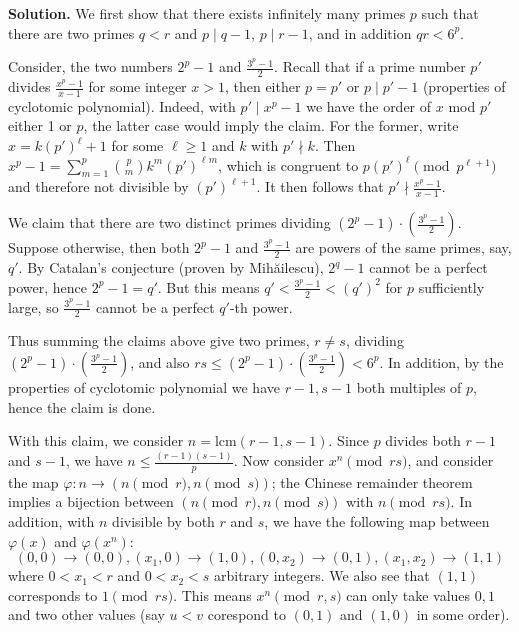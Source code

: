 \documentclass[11pt,a4paper]{article}
\begin{document}
\begin{enumerate}
	\textbf{Solution.} 
	We first show that there exists infinitely many primes $p$ such that there are two primes $q< r$ and $p\mid q-1$, $p\mid r - 1$, and in addition $qr< 6^p$. 
	
	Consider, the two numbers $2^p - 1$ and $\frac{3^p - 1}{2}$. 
	Recall that if a prime number $p'$ divides $\frac{x^p-1}{x - 1}$ for some integer $x > 1$, then either $p=p'$ or $p\mid p' - 1$ (properties of cyclotomic polynomial). 
	Indeed, with $p'\mid x^p-1$ we have the order of $x$ mod $p'$ either 1 or $p$, 
	the latter case would imply the claim. 
	For the former, write $x=k(p')^{\ell} + 1$ for some $\ell\ge 1$ and $k$ with $p'\nmid k$. 
	Then $x^p-1 = \sum_{m=1}^p \binom{p}{m} k^{m}(p')^{\ell m}$, 
	which is congruent to $p(p')^{\ell}\pmod{p^{\ell+1}}$ and therefore not divisible by $(p')^{\ell+1}$. 
	It then follows that $p'\nmid \frac{x^p-1}{x - 1}$. 
	
	We claim that there are two distinct primes dividing $(2^p - 1)\cdot (\frac{3^p - 1}{2})$. 
	Suppose otherwise, then both $2^p-1$ and $\frac{3^p - 1}{2}$ are powers of the same primes, 
	say, $q'$. 
	By Catalan's conjecture (proven by Mihăilescu), 
	$2^q-1$ cannot be a perfect power, hence $2^p-1=q'$. 
	But this means $q' < \frac{3^p - 1}{2} < (q')^2$ for $p$ sufficiently large, 
	so $\frac{3^p - 1}{2}$ cannot be a perfect $q'$-th power. 
	
	Thus summing the claims above give two primes, $r\neq s$, dividing $(2^p - 1)\cdot (\frac{3^p - 1}{2})$, 
	and also $rs \le (2^p - 1)\cdot (\frac{3^p - 1}{2}) < 6^p$. 
	In addition, by the properties of cyclotomic polynomial we have $r-1, s-1$ both multiples of $p$, 
	hence the claim is done. 
	
	With this claim, we consider $n = \text{lcm}(r - 1, s - 1)$. 
	Since $p$ divides both $r-1$ and $s-1$, we have $n\le \frac{(r - 1)(s - 1)}{p}$. 
	Now consider $x^n\pmod{rs}$, 
	and consider the map $\varphi: n\to (n\pmod{r}, n\pmod{s})$; 
	the Chinese remainder theorem implies a bijection between $(n\pmod{r}, n\pmod{s})$ with $n\pmod{rs}$. 
	In addition, with $n$ divisible by both $r$ and $s$, 
	we have the following map between $\varphi(x)$ and $\varphi(x^n)$: 
	\begin{equation}
		(0, 0)\to (0, 0), (x_1, 0)\to (1, 0), (0, x_2)\to (0, 1), (x_1, x_2)\to (1, 1)
	\end{equation}
    where $0<x_1<r$ and $0<x_2<s$ arbitrary integers. 
	We also see that $(1, 1)$ corresponds to $1\pmod{rs}$. 
	This means $x^n\pmod{r, s}$ can only take values $0, 1$ and two other values (say $u < v$ corespond to $(0, 1)$ and $(1, 0)$ in some order). 
	

\end{enumerate}
\end{document}
